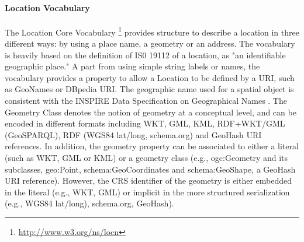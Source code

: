 \paragraph{Location Vocabulary}
The Location Core Vocabulary \footnote{\url{http://www.w3.org/ns/locn}} provides structure to describe a location in three different ways: by using a place name, a geometry or an address. The vocabulary is heavily based on the definition of IS0 19112 of a location, as "an identifiable geographic place." A part from using simple string labels or names, the vocabulary provides a property to allow a Location to be defined by a URI, such as GeoNames or DBpedia URI. The geographic name used for a spatial object is consistent with the INSPIRE Data Specification on Geographical Names \cite{inspire2009}. The Geometry Class denotes the notion of geometry at a conceptual level, and can be encoded in different formats including WKT, GML, KML, RDF+WKT/GML (GeoSPARQL), RDF (WGS84 lat/long, schema.org) and GeoHash URI references. In addition, 
the geometry property can be associated to either a literal (such as WKT, GML or KML) or a geometry class (e.g., ogc:Geometry and its subclasses, geo:Point, schema:GeoCoordinates and schema:GeoShape, a GeoHash URI reference). However, the CRS identifier of the geometry is either embedded in the literal (e.g., WKT, GML) or implicit in the more structured serialization (e.g., WGS84 lat/long), schema.org, GeoHash).


